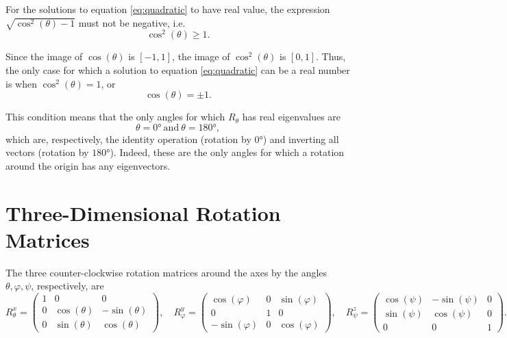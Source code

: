 \documentclass[a4paper]{article}
\begin{document}
For the solutions to equation \ref{eq:quadratic} to have real value, the expression $\sqrt{\cos^{2}(\theta)-1}$ must not be negative, i.e.
\begin{equation}
	\cos^{2}(\theta) \geq 1.
	\label{eq:desc}
\end{equation}

Since the image of $\cos(\theta)$ is $\left[ -1,1 \right]$, the image of $\cos^{2}(\theta)$ is $[0,1]$. Thus, the only case for which a solution to equation \ref{eq:quadratic} can be a real number is when $\cos^{2}(\theta)=1$, or
\begin{equation}
	\cos(\theta) = \pm 1.
	\label{eq:cond}
\end{equation}

This condition means that the only angles for which $R_{\theta}$ has real eigenvalues are
\begin{equation*}
	\theta=\ang{0}\ \text{and}\ \theta=\ang{180},
\end{equation*}
which are, respectively, the identity operation (rotation by $\ang{0}$) and inverting all vectors (rotation by $\ang{180}$). Indeed, these are the only angles for which a rotation around the origin has any eigenvectors.

\section{Three-Dimensional Rotation Matrices}
The three counter-clockwise rotation matrices around the axes by the angles $\theta, \varphi, \psi$, respectively, are
\begin{equation}
	R^{x}_{\theta} = \begin{pmatrix}
		1 & 0 & 0\\
		0 & \cos(\theta) & -\sin(\theta)\\
		0 & \sin(\theta) & \cos(\theta)
	\end{pmatrix},\quad
	R^{y}_{\varphi} = \begin{pmatrix}
		\cos(\varphi) & 0 & \sin(\varphi)\\
		0 & 1 & 0\\
		-\sin(\varphi) & 0 & \cos(\varphi)
	\end{pmatrix},\quad
	R^{z}_{\psi} = \begin{pmatrix}
		\cos(\psi) & -\sin(\psi)& 0\\
		\sin(\psi) & \cos(\psi) & 0\\
		0 & 0 & 1
	\end{pmatrix}.
	\label{eq:3d_rot}
\end{equation}
\end{document}
